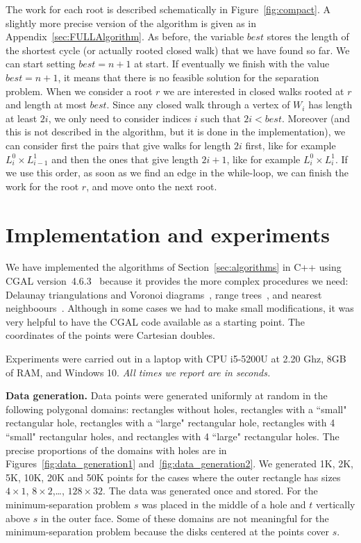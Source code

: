 \documentclass[a4paper,USenglish]{lipics}
\def\best{\mathit{best}}
\def\myparagraph#1{\medskip\noindent\textbf{#1.}}
\begin{document}
The work for each root is described schematically in Figure~\ref{fig:compact}.
A slightly more precise version of the algorithm is given 
as  in Appendix~\ref{sec:FULLAlgorithm}.
As before, the variable $\best$ stores the length of the shortest cycle (or actually
rooted closed walk) that we have found so far. We can start setting $\best=n+1$
at start.
If eventually we finish with the value $\best=n+1$, it means that there is no
feasible solution for the separation problem.
When we consider a root $r$ we are interested in closed walks rooted at $r$
and length at most $\best$. Since any closed walk through a vertex of $W_i$ has
length at least $2i$, we only need to consider indices $i$ such that $2i<\best$.
Moreover (and this is not described in the algorithm, but it is done
in the implementation), we can consider first
the pairs that give walks for length $2i$ first, like for example $L^0_i\times L^1_{i-1}$ 
and then the ones that give length  $2i+1$, like for example $L^0_i\times L^1_i$.
If we use this order, as soon as we find an edge in 
the while-loop, we can finish the work for the root $r$, and move onto the next root.


\section{Implementation and experiments}
\label{sec:implementation}

We have implemented the algorithms of Section~\ref{sec:algorithms}
in C++ using CGAL version~4.6.3~\cite{cgal}
because it provides the more complex procedures we need:
Delaunay triangulations and Voronoi diagrams~\cite{cgal:k-vda2-15a}, 
range trees~\cite{cgal:n-rstd-15a}, and nearest neighboours~\cite{cgal:tf-ssd-15a}.
Although in some cases we had to make small modifications, it was
very helpful to have the CGAL code available as a starting point. 
The coordinates of the points were Cartesian doubles.

Experiments were carried out in a laptop with CPU i5-5200U at 2.20 Ghz, 
8GB of RAM, and Windows 10. \emph{All times we report are in seconds.}

\myparagraph{Data generation}
Data points were generated uniformly at random in the following polygonal domains:
rectangles without holes, rectangles with a ``small" rectangular hole, rectangles
with a ``large" rectangular hole, rectangles with 4 ``small" rectangular holes, 
and rectangles with 4 ``large" rectangular holes. The precise proportions of the domains
with holes are in Figures~\ref{fig:data_generation1} and~\ref{fig:data_generation2}.
We generated 1K, 2K, 5K, 10K, 20K and 50K points for the cases where the outer rectangle
has sizes $4\times 1$, $8\times 2$,\ldots, $128\times 32$.
The data was generated once and stored.
For the minimum-separation problem $s$ was placed in the middle of a hole and 
$t$ vertically above $s$ in the outer face.  
Some of these domains are not meaningful for the minimum-separation problem 
because the disks centered at the points cover $s$. 
\end{document}
